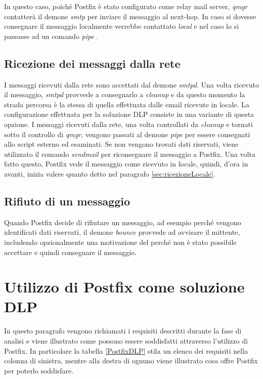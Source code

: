   In questo caso, poiché Postfix è stato configurato come relay mail server, 
  \textit{qmgr} contatterà il demone \textit{smtp} per inviare il messaggio al next-hop. In caso si dovesse consegnare 
  il messaggio localmente verrebbe contattato \textit{local} e nel caso lo si passasse ad un comando \textit{pipe} \cite{Postfix2}.
  
  \subsection{Ricezione dei messaggi dalla rete}
  I messaggi ricevuti dalla rete sono accettati dal demone \textit{smtpd}. Una volta ricevuto il messaggio, 
  \textit{smtpd} provvede a consegnarlo a \textit{cleanup} e da questo momento la strada percorsa 
  è la stessa di quella effettuata dalle email ricevute in locale.
  La configurazione effettuata per la soluzione DLP consiste in una variante di questa opzione.
  I messaggi ricevuti dalla rete, una volta controllati da \textit{cleanup}
  e tornati sotto il controllo di \textit{qmgr}, vengono passati al demone \textit{pipe} 
  per essere consegnati allo script esterno ed esaminati.
  Se non vengono trovati dati riservati, viene utilizzato il comando \textit{sendmail} per riconsegnare 
  il messaggio a Postfix. 
  Una volta fatto questo, Postfix vede il messaggio come ricevuto in locale, quindi, d'ora in avanti, inizia valere 
  quanto detto nel paragrafo \ref{sec:ricezioneLocale}.
  
  \subsection{Rifiuto di un messaggio}
  Quando Postfix decide di rifiutare un messaggio, ad esempio perché vengono identificati dati riservati, 
  il demone \textit{bounce} provvede ad avvisare il mittente, includendo opzionalmente una motivazione del perché non è 
  stato possibile accettare e quindi consegnare il messaggio.
  
  \section{Utilizzo di Postfix come soluzione DLP}
  In questo paragrafo vengono richiamati i requisiti descritti durante la fase di analisi e 
  viene illustrato come possono essere soddisfatti attraverso l'utilizzo di Postfix. In particolare la tabella
  \ref{PostfixDLP} stila un elenco dei requisiti nella colonna di sinistra, mentre alla destra di ognuno viene illustrato
  cosa offre Postfix per poterlo soddisfare.
  
